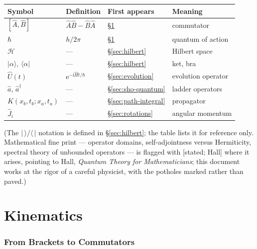 \documentclass[11pt]{article}
\theoremstyle{plain}
\theoremstyle{definition}
\theoremstyle{remark}
\newcommand{\ee}{\mathrm{e}}
\newcommand{\ii}{\mathrm{i}}
\newcommand{\op}[1]{\hat{#1}}
\newcommand{\ket}[1]{\lvert #1 \rangle}
\newcommand{\bra}[1]{\langle #1 \rvert}
\begin{document}
\begin{center}
\begin{tabular}{llll}
\toprule
Symbol & Definition & First appears & Meaning \\
\midrule
$[\op A, \op B]$ & $\op A\op B - \op B\op A$ & \S\ref{sec:brackets-commutators} & commutator \\
$\hbar$ & $h/2\pi$ & \S\ref{sec:brackets-commutators} & quantum of action \\
$\mathcal H$ & --- & \S\ref{sec:hilbert} & Hilbert space \\
$\ket{\alpha}$, $\bra{\alpha}$ & --- & \S\ref{sec:hilbert} & ket, bra \\
$\op U(t)$ & $\ee^{-\ii\op H t/\hbar}$ & \S\ref{sec:evolution} & evolution operator \\
$\op a$, $\op a^\dagger$ & --- & \S\ref{sec:sho-quantum} & ladder operators \\
$K(x_b, t_b; x_a, t_a)$ & --- & \S\ref{sec:path-integral} & propagator \\
$\op J_i$ & --- & \S\ref{sec:rotations} & angular momentum \\
\bottomrule
\end{tabular}
\end{center}

\vspace{1ex}
\noindent
(The $\ket{\,}$/$\bra{\,}$ notation is defined in
\S\ref{sec:hilbert}; the table lists it for reference only.
Mathematical fine print --- operator domains, self-adjointness
versus Hermiticity, spectral theory of unbounded operators --- is
flagged with [stated; Hall] where it arises, pointing to Hall,
\emph{Quantum Theory for Mathematicians}; this document works at the
rigor of a careful physicist, with the potholes marked rather than
paved.)

\clearpage
\part{Kinematics}

\section{From Brackets to Commutators}
\label{sec:brackets-commutators}
\end{document}
